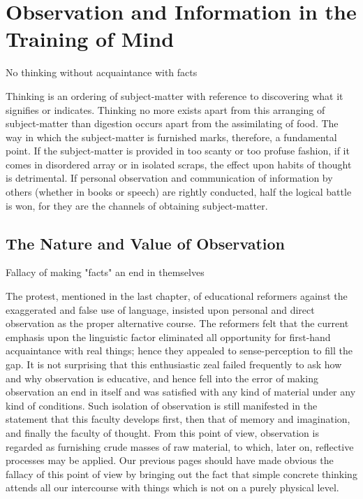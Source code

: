 \documentclass[letterpaper]{book}
\begin{document}
\chapter{Observation and Information in the Training of Mind}

No thinking without acquaintance with facts

Thinking is an ordering of subject-matter with reference to discovering
what it signifies or indicates. Thinking no more exists apart from this
arranging of subject-matter than digestion occurs apart from the
assimilating of food. The way in which the subject-matter is furnished
marks, therefore, a fundamental point. If the subject-matter is provided
in too scanty or too profuse fashion, if it comes in disordered array or
in isolated scraps, the effect upon habits of thought is detrimental. If
personal observation and communication of information by others (whether
in books or speech) are rightly conducted, half the logical battle is
won, for they are the channels of obtaining subject-matter.

\section{The Nature and Value of Observation}

Fallacy of making "facts" an end in themselves

The protest, mentioned in the last chapter, of educational reformers
against the exaggerated and false use of language, insisted upon
personal and direct observation as the proper alternative course. The
reformers felt that the current emphasis upon the linguistic factor
eliminated all opportunity for first-hand acquaintance with real things;
hence they appealed to sense-perception to fill the gap. It is not
surprising that this enthusiastic zeal failed frequently to ask how and
why
observation is educative, and hence fell into the error of making
observation an end in itself and was satisfied with any kind of material
under any kind of conditions. Such isolation of observation is still
manifested in the statement that this faculty develops first, then that
of memory and imagination, and finally the faculty of thought. From this
point of view, observation is regarded as furnishing crude masses of raw
material, to which, later on, reflective processes may be applied. Our
previous pages should have made obvious the fallacy of this point of
view by bringing out the fact that simple concrete thinking attends all
our intercourse with things which is not on a purely physical level.
\end{document}
